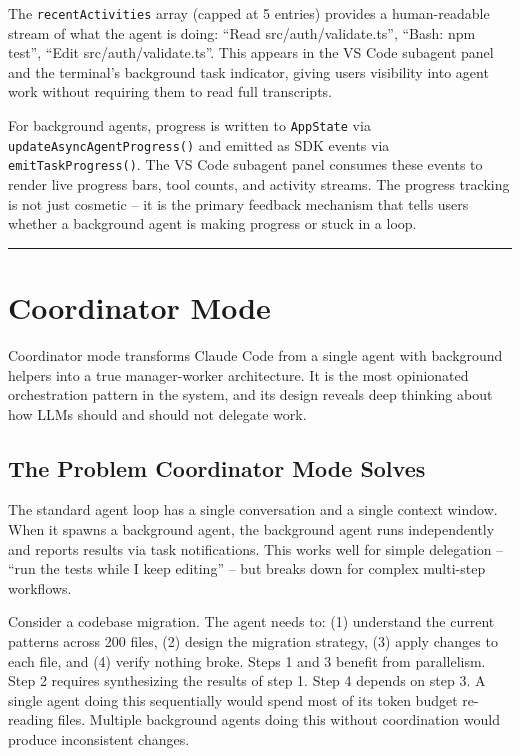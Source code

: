 \documentclass[
  english,
  11pt,
  letterpaper,
]{book}
\begin{document}
The \texttt{recentActivities} array (capped at 5 entries) provides a
human-readable stream of what the agent is doing: ``Read
src/auth/validate.ts'', ``Bash: npm test'', ``Edit
src/auth/validate.ts''. This appears in the VS Code subagent panel and
the terminal's background task indicator, giving users visibility into
agent work without requiring them to read full transcripts.

For background agents, progress is written to \texttt{AppState} via
\texttt{updateAsyncAgentProgress()} and emitted as SDK events via
\texttt{emitTaskProgress()}. The VS Code subagent panel consumes these
events to render live progress bars, tool counts, and activity streams.
The progress tracking is not just cosmetic -- it is the primary feedback
mechanism that tells users whether a background agent is making progress
or stuck in a loop.

\begin{center}\rule{0.5\linewidth}{0.5pt}\end{center}

\section{Coordinator Mode}\label{coordinator-mode}

Coordinator mode transforms Claude Code from a single agent with
background helpers into a true manager-worker architecture. It is the
most opinionated orchestration pattern in the system, and its design
reveals deep thinking about how LLMs should and should not delegate
work.

\subsection{The Problem Coordinator Mode
Solves}\label{the-problem-coordinator-mode-solves}

The standard agent loop has a single conversation and a single context
window. When it spawns a background agent, the background agent runs
independently and reports results via task notifications. This works
well for simple delegation -- ``run the tests while I keep editing'' --
but breaks down for complex multi-step workflows.

Consider a codebase migration. The agent needs to: (1) understand the
current patterns across 200 files, (2) design the migration strategy,
(3) apply changes to each file, and (4) verify nothing broke. Steps 1
and 3 benefit from parallelism. Step 2 requires synthesizing the results
of step 1. Step 4 depends on step 3. A single agent doing this
sequentially would spend most of its token budget re-reading files.
Multiple background agents doing this without coordination would produce
inconsistent changes.
\end{document}
